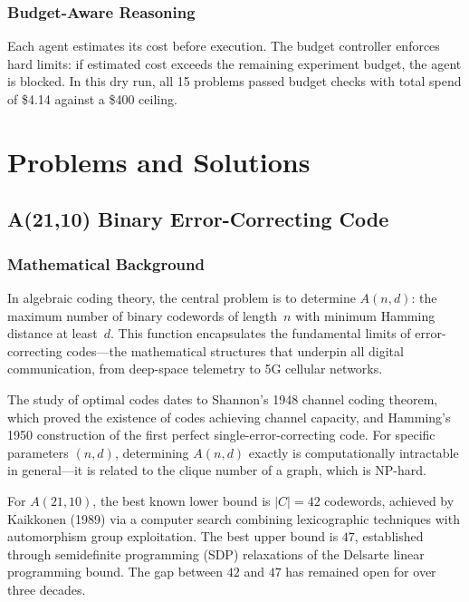\documentclass[12pt,a4paper]{report}
\theoremstyle{plain}
\theoremstyle{definition}
\theoremstyle{remark}
\begin{document}
\section{Budget-Aware Reasoning}

Each agent estimates its cost before execution. The budget controller enforces hard
limits: if estimated cost exceeds the remaining experiment budget, the agent is blocked.
In this dry run, all 15 problems passed budget checks with total spend of \$4.14
against a \$400 ceiling.

\part{Problems and Solutions}

\chapter{A(21,10) Binary Error-Correcting Code}
\label{ch:a21}

\section{Mathematical Background}

In algebraic coding theory, the central problem is to determine $A(n,d)$: the maximum
number of binary codewords of length~$n$ with minimum Hamming distance at least~$d$.
This function encapsulates the fundamental limits of error-correcting codes—the
mathematical structures that underpin all digital communication, from deep-space
telemetry to 5G cellular networks.

The study of optimal codes dates to Shannon's 1948 channel coding theorem, which
proved the existence of codes achieving channel capacity, and Hamming's 1950
construction of the first perfect single-error-correcting code. For specific parameters
$(n,d)$, determining $A(n,d)$ exactly is computationally intractable in general—it is
related to the clique number of a graph, which is NP-hard.

For $A(21,10)$, the best known lower bound is $|C| = 42$ codewords, achieved by
Kaikkonen (1989) via a computer search combining lexicographic techniques with
automorphism group exploitation. The best upper bound is $47$, established through
semidefinite programming (SDP) relaxations of the Delsarte linear programming bound.
The gap between $42$ and $47$ has remained open for over three decades.
\end{document}
